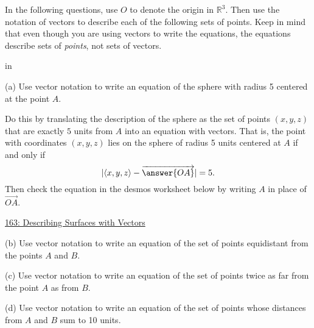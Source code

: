 \documentclass{ximera}
\newcommand{\pskip}{\vskip 0.1 in}
\begin{document}
\begin{question}  \label{Eq:32404:Vectors}
In the following questions, use $O$ to denote the origin in $\mathbb{R}^3$. Then use the notation of vectors to describe each of the following sets of points. Keep in mind that even though you are using vectors to write the equations, the equations describe sets of \emph{points}, not sets of vectors.


 
\pskip

(a) Use vector notation to write an equation of the sphere with radius 5 centered at the point $A$. 

Do this by translating the description of the sphere as the set of points $(x,y,z)$ that are exactly $5$ units from $A$ into an equation with vectors. That is, the point with coordinates $(x,y,z)$ lies on the sphere of radius 5 units centered at $A$ if and only if
\[
      | \langle x,y,z \rangle  - \overrightarrow{\answer{OA}} | = 5 .
\]
Then check the equation in the desmos worksheet below by writing $A$ in place of $\overrightarrow{OA}$.

\begin{onlineOnly}
    \begin{center}
\end{center}
\end{onlineOnly}
 
\href{https://www.desmos.com/3d/wiyxc2rwhu}{163: Describing Surfaces with Vectors}

(b) Use vector notation to write an equation of the set of points equidistant from the points $A$ and $B$.

(c) Use vector notation to write an equation of the set of points twice as far from the point $A$ as from $B$.

(d) Use vector notation to write an equation of the set of points whose distances from $A$ and $B$ sum to 10 units.


\end{question}
\end{document}
